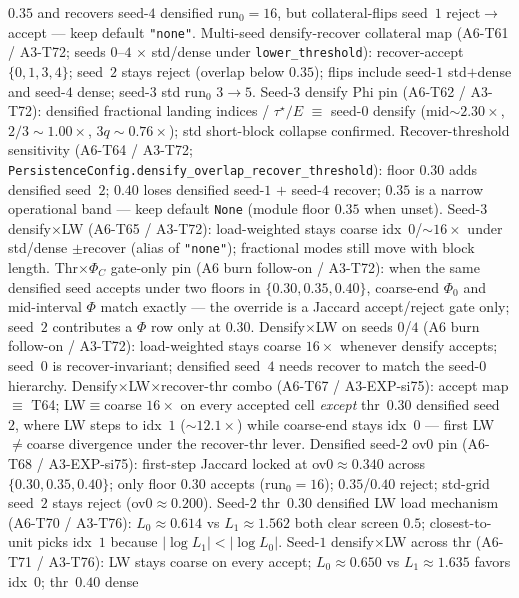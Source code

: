 \documentclass[11pt]{article}
\begin{document}
$0.35$ and recovers seed-$4$ densified $\mathrm{run}_0{=}16$, but
collateral-flips seed~$1$ reject$\to$accept --- keep default
\texttt{"none"}. Multi-seed densify-recover collateral map
(A6-T61 / A3-T72; seeds $0$--$4$ $\times$ std/dense under
\texttt{lower\_threshold}): recover-accept $\{0,1,3,4\}$; seed~$2$ stays
reject (overlap below $0.35$); flips include seed-$1$ std$+$dense and
seed-$4$ dense; seed-$3$ std $\mathrm{run}_0$ $3\to 5$. Seed-$3$ densify
Phi pin (A6-T62 / A3-T72): densified fractional landing indices /
$\tau^\star/E$ $\equiv$ seed-$0$ densify (mid$\sim 2.30\times$,
$2/3\sim 1.00\times$, $3q\sim 0.76\times$); std short-block collapse
confirmed. Recover-threshold sensitivity
(A6-T64 / A3-T72; \texttt{PersistenceConfig.densify\_overlap\_recover\_threshold}):
floor $0.30$ adds densified seed~$2$; $0.40$ loses densified seed-$1$ $+$
seed-$4$ recover; $0.35$ is a narrow operational band --- keep default
\texttt{None} (module floor $0.35$ when unset). Seed-$3$ densify$\times$LW
(A6-T65 / A3-T72): load-weighted stays coarse idx~$0$/$\sim 16\times$
under std/dense $\pm$recover (alias of \texttt{"none"}); fractional modes
still move with block length. Thr$\times\Phi_C$ gate-only pin
(A6 burn follow-on / A3-T72): when the same densified seed accepts under
two floors in $\{0.30,0.35,0.40\}$, coarse-end $\Phi_0$ and mid-interval
$\Phi$ match exactly --- the override is a Jaccard accept/reject gate
only; seed~$2$ contributes a $\Phi$ row only at $0.30$. Densify$\times$LW
on seeds $0$/$4$ (A6 burn follow-on / A3-T72): load-weighted stays coarse
$16\times$ whenever densify accepts; seed~$0$ is recover-invariant;
densified seed~$4$ needs recover to match the seed-$0$ hierarchy.
Densify$\times$LW$\times$recover-thr combo (A6-T67 / A3-EXP-si75):
accept map $\equiv$ T64; LW$\equiv$coarse $16\times$ on every accepted
cell \emph{except} thr~$0.30$ densified seed~$2$, where LW steps to
idx~$1$ ($\sim 12.1\times$) while coarse-end stays idx~$0$ --- first
LW$\neq$coarse divergence under the recover-thr lever. Densified seed-$2$
ov$0$ pin (A6-T68 / A3-EXP-si75): first-step Jaccard locked at
ov$0\approx 0.340$ across $\{0.30,0.35,0.40\}$; only floor $0.30$
accepts ($\mathrm{run}_0{=}16$); $0.35$/$0.40$ reject; std-grid seed~$2$
stays reject (ov$0\approx 0.200$). Seed-$2$ thr~$0.30$ densified LW load
mechanism (A6-T70 / A3-T76): $L_0\approx 0.614$ vs $L_1\approx 1.562$
both clear screen $0.5$; closest-to-unit picks idx~$1$ because
$|\log L_1|<|\log L_0|$. Seed-$1$ densify$\times$LW across thr
(A6-T71 / A3-T76): LW stays coarse on every accept;
$L_0\approx 0.650$ vs $L_1\approx 1.635$ favors idx~$0$; thr~$0.40$ dense
\end{document}
